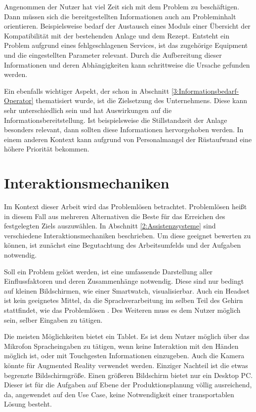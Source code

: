 Angenommen der Nutzer hat viel Zeit sich mit dem Problem zu beschäftigen. Dann müssen sich die bereitgestellten Informationen auch am Probleminhalt orientieren. Beispielsweise bedarf der Austausch eines Moduls einer Übersicht der Kompatibilität mit der bestehenden Anlage und dem Rezept. Entsteht ein Problem aufgrund eines fehlgeschlagenen  Services, ist das zugehörige Equipment und die eingestellten Parameter relevant. Durch die Aufbereitung dieser Informationen und deren Abhängigkeiten kann schrittweise die Ursache gefunden werden.

Ein ebenfalls wichtiger Aspekt, der schon in Abschnitt \ref{3:Informationsbedarf-Operator} thematisiert wurde, ist die Zielsetzung des Unternehmens. Diese kann sehr unterschiedlich sein und hat Auswirkungen auf die Informationsbereitstellung. Ist beispielsweise die Stillstandzeit der Anlage besonders relevant, dann sollten diese Informationen hervorgehoben werden. In einem anderen Kontext kann aufgrund von Personalmangel der Rüstaufwand eine höhere Priorität bekommen.

\section{Interaktionsmechaniken}
Im Kontext dieser Arbeit wird das Problemlösen betrachtet. Problemlösen heißt in diesem Fall aus mehreren Alternativen die Beste für das Erreichen des festgelegten Ziels auszuwählen. In Abschnitt \ref{2:Assistenzsysteme} sind verschiedene Interaktionsmechaniken beschrieben. Um diese geeignet bewerten zu können, ist zunächst eine Begutachtung des Arbeitsumfelds und der Aufgaben notwendig.

Soll ein Problem gelöst werden, ist eine umfassende Darstellung aller Einflussfaktoren und deren Zusammenhänge notwendig. Diese sind nur bedingt auf kleinen Bildschirmen, wie einer Smartwatch, visualisierbar. Auch ein Headset ist kein geeignetes Mittel, da die Sprachverarbeitung im selben Teil des Gehirn stattfindet, wie das Problemlösen \cite{Zuhlke2012}. Des Weiteren muss es dem Nutzer möglich sein, selber Eingaben zu tätigen. 

Die meisten Möglichkeiten bietet ein Tablet. Es ist dem Nutzer möglich über das Mikrofon Spracheingaben zu tätigen, wenn keine Interaktion mit den Händen möglich ist, oder mit Touchgesten Informationen einzugeben. Auch die Kamera könnte für Augmented Reality verwendet werden. Einziger Nachteil ist die etwas begrenzte Bildschirmgröße. Einen größeren Bildschirm bietet nur ein Desktop PC. Dieser ist für die Aufgaben auf Ebene der Produktionsplanung völlig ausreichend, da, angewendet auf den Use Case, keine Notwendigkeit einer transportablen Lösung besteht.

